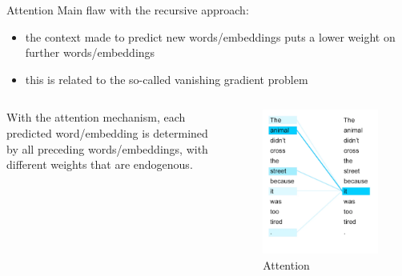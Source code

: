 \documentclass[
  ignorenonframetext,
]{beamer}
\providecommand{\tightlist}{%
  \setlength{\itemsep}{0pt}\setlength{\parskip}{0pt}}\usepackage{longtable,booktabs,array}
\begin{document}
\begin{frame}{Attention}
\label{attention}
Main flaw with the recursive approach:

\begin{itemize}
\tightlist
\item
  the context made to predict new words/embeddings puts a lower weight
  on further words/embeddings
\item
  this is related to the so-called vanishing gradient problem
\end{itemize}

\pause

\begin{columns}[T]
\begin{column}{0.48\linewidth}
With the attention mechanism, each predicted word/embedding is
determined by all preceding words/embeddings, with different weights
that are endogenous.
\end{column}

\begin{column}{0.48\linewidth}
\begin{figure}[H]

{\centering \includegraphics[width=0.5\linewidth,height=\textheight,keepaspectratio]{assets/attention.webp}

}

\caption{Attention}

\end{figure}%
\end{column}
\end{columns}

\pause
\end{frame}
\end{document}
